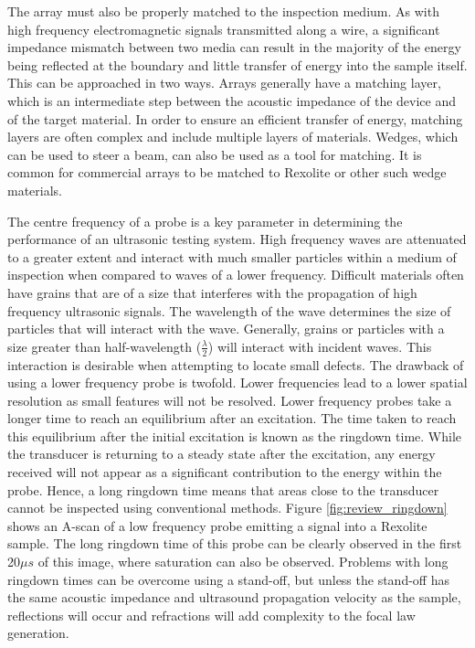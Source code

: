 The array must also be properly matched to the inspection medium. As with high frequency electromagnetic signals transmitted along a wire, a significant impedance mismatch between two media can result in the majority of the energy being reflected at the boundary and little transfer of energy into the sample itself. This can be approached in two ways. Arrays generally have a matching layer, which is an intermediate step between the acoustic impedance of the device and of the target material. In order to ensure an efficient transfer of energy, matching layers are often complex and include multiple layers of materials. Wedges, which can be used to steer a beam, can also be used as a tool for matching. It is common for commercial arrays to be matched to Rexolite\cite{rexolite_web} or other such wedge materials.

The centre frequency of a probe is a key parameter in determining the performance of an ultrasonic testing system. High frequency waves are attenuated to a greater extent and interact with much smaller particles within a medium of inspection when compared to waves of a lower frequency. Difficult materials often have grains that are of a size that interferes with the propagation of high frequency ultrasonic signals. The wavelength of the wave determines the size of particles that will interact with the wave. Generally, grains or particles with a size greater than half-wavelength ($\frac{\lambda}{2}$) will interact with incident waves. This interaction is desirable when attempting to locate small defects. The drawback of using a lower frequency probe is twofold. Lower frequencies lead to a lower spatial resolution as small features will not be resolved\cite{simonetti_multiple_2006}. Lower frequency probes take a longer time to reach an equilibrium after an excitation. The time taken to reach this equilibrium after the initial excitation is known as the ringdown time. While the transducer is returning to a steady state after the excitation, any energy received will not appear as a significant contribution to the energy within the probe. Hence, a long ringdown time means that areas close to the transducer cannot be inspected using conventional methods. Figure \ref{fig:review_ringdown} shows an A-scan of a low frequency probe emitting a signal into a Rexolite sample. The long ringdown time of this probe can be clearly observed in the first 20${\mu}s$ of this image, where saturation can also be observed. Problems with long ringdown times can be overcome using a stand-off, but unless the stand-off has the same acoustic impedance and ultrasound propagation velocity as the sample, reflections will occur and refractions will add complexity to the focal law generation.

